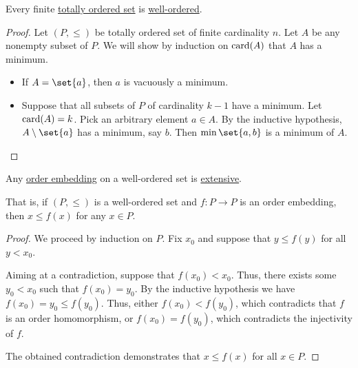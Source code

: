 \begin{proposition}\label{thm:finite_totally_ordered_set_is_well_ordered}
  Every finite \hyperref[def:totally_ordered_set]{totally ordered set} is \hyperref[def:well_ordered_set]{well-ordered}.
\end{proposition}
\begin{proof}
  Let \( (P, \leq) \) be totally ordered set of finite cardinality \( n \). Let \( A \) be any nonempty subset of \( P \). We will show by induction on \( \operatorname{card}(A) \) that \( A \) has a minimum.

  \begin{itemize}
    \item If \( A = \set{ a } \), then \( a \) is vacuously a minimum.
    \item Suppose that all subsets of \( P \) of cardinality \( k - 1 \) have a minimum. Let \( \operatorname{card}(A) = k \). Pick an arbitrary element \( a \in A \). By the inductive hypothesis, \( A \setminus \set{ a } \) has a minimum, say \( b \). Then \( \min\set{ a, b } \) is a minimum of \( A \).
  \end{itemize}
\end{proof}

\begin{lemma}\label{thm:well_ordered_embedding_extensive}
  Any \hyperref[def:order_function/embedding]{order embedding} on a well-ordered set is \hyperref[def:extensive_function]{extensive}.

  That is, if \( (P, \leq) \) is a well-ordered set and \( f: P \to P \) is an order embedding, then \( x \leq f(x) \) for any \( x \in P \).
\end{lemma}
\begin{proof}
  We proceed by induction on \( P \). Fix \( x_0 \) and suppose that \( y \leq f(y) \) for all \( y < x_0 \).

  Aiming at a contradiction, suppose that \( f(x_0) < x_0 \). Thus, there exists some \( y_0 < x_0 \) such that \( f(x_0) = y_0 \). By the inductive hypothesis we have \( f(x_0) = y_0 \leq f(y_0) \). Thus, either \( f(x_0) < f(y_0) \), which contradicts that \( f \) is an order homomorphism, or \( f(x_0) = f(y_0) \), which contradicts the injectivity of \( f \).

  The obtained contradiction demonstrates that \( x \leq f(x) \) for all \( x \in P \).
\end{proof}

